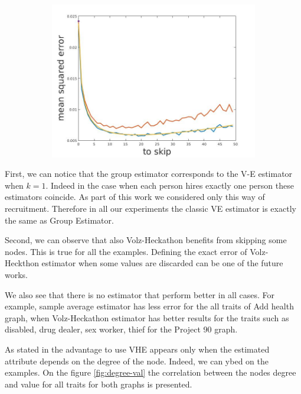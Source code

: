 \documentclass[12pt]{report}
\begin{document}
\begin{figure}[h]
\begin{subfigure}[b]{0.3\textwidth}
    \end{subfigure}
    ~
    \begin{subfigure}[b]{0.3\textwidth}
        \includegraphics[width=\textwidth]{estimators_school}
        
    \end{subfigure}
    

\end{figure} 


First, we can notice that the group estimator corresponds to the V-E estimator when $k = 1$. Indeed in the case when each person hires exactly one person these estimators coincide. As part of this work we considered only this way of recruitment. Therefore in all our experiments the classic VE estimator is exactly the same as Group Estimator.

Second, we can observe that also Volz-Heckathon benefits from skipping some nodes. This is true for all the examples. Defining the exact error of Volz-Heckthon estimator when some values are discarded can be one of the future works.

We also see that there is no estimator that perform better in all cases. For example, sample average estimator has less error for the all traits of Add health graph, when Volz-Heckathon estimator has better results for the traits such as disabled, drug dealer, sex worker, thief for the Project 90 graph.


As stated in \cite{goel2010assessing} the advantage to use VHE appears only when the estimated attribute depends on the degree of the node. Indeed, we can ybed on the examples. On the figure \ref{fig:degree-val} the correlation between the nodes degree and value for all traits for both graphs is presented.
\end{document}
